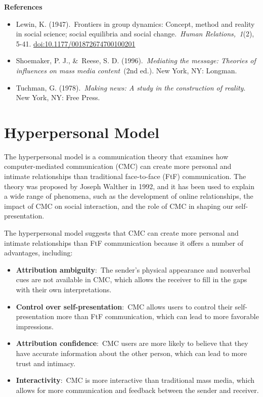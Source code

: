 \documentclass[
  b5paper]{book}
\begin{document}
\textbf{References}

\begin{itemize}
\item
  Lewin, K. (1947).~Frontiers in group dynamics: Concept, method and reality in social science; social equilibria and social change.~\emph{Human Relations,~1}(2), 5-41. \url{doi:10.1177/001872674700100201}
\item
  Shoemaker, P. J., \&~Reese, S. D. (1996).~\emph{Mediating the message: Theories of influences on mass media content}~(2nd ed.). New York, NY: Longman.
\item
  Tuchman, G. (1978).~\emph{Making news: A study in the construction of reality}. New York, NY: Free Press.
\end{itemize}

\hypertarget{hyperpersonal-model}{%
\section{Hyperpersonal Model}\label{hyperpersonal-model}}

The hyperpersonal model is a communication theory that examines how computer-mediated communication (CMC) can create more personal and intimate relationships than traditional face-to-face (FtF) communication. The theory was proposed by Joseph Walther in 1992, and it has been used to explain a wide range of phenomena, such as the development of online relationships, the impact of CMC on social interaction, and the role of CMC in shaping our self-presentation.

The hyperpersonal model suggests that CMC can create more personal and intimate relationships than FtF communication because it offers a number of advantages, including:

\begin{itemize}
\item
  \textbf{Attribution ambiguity}:~The sender's physical appearance and nonverbal cues are not available in CMC, which allows the receiver to fill in the gaps with their own interpretations.
\item
  \textbf{Control over self-presentation}:~CMC allows users to control their self-presentation more than FtF communication, which can lead to more favorable impressions.
\item
  \textbf{Attribution confidence}:~CMC users are more likely to believe that they have accurate information about the other person, which can lead to more trust and intimacy.
\item
  \textbf{Interactivity}:~CMC is more interactive than traditional mass media, which allows for more communication and feedback between the sender and receiver.
\end{itemize}
\end{document}
